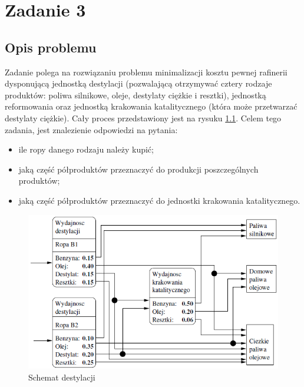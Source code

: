 \chapter{Zadanie 3}
\thispagestyle{chapterBeginStyle}
\label{rozdzial3}
\section{Opis problemu}
Zadanie polega na rozwiązaniu problemu minimalizacji kosztu pewnej rafinerii dysponującą jednostką destylacji
(pozwalającą otrzymywać cztery rodzaje produktów: poliwa silnikowe, oleje, destylaty ciężkie i resztki),
jednostką reformowania oraz jednostką krakowania katalitycznego (która może przetwarzać destylaty ciężkie). 
Cały proces przedstawiony jest na rysuku \ref{rafineria}. Celem tego zadania, jest znalezienie odpowiedzi na pytania: 

\begin{itemize}
    \item ile ropy danego rodzaju należy kupić;
    \item jaką część półproduktów przeznaczyć do produkcji poszczególnych produktów;
    \item jaką część półproduktów przeznaczyć do jednostki krakowania katalitycznego.
\end{itemize}

\begin{figure}[h]
    \centering
    \includegraphics[scale=0.95]{zad3.png}
    \caption{Schemat destylacji}
    \label{rafineria}
\end{figure}
\ \\
